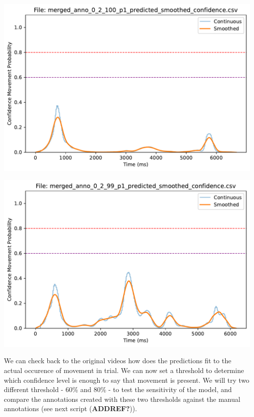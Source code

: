 \documentclass[
  letterpaper,
  DIV=11,
  numbers=noendperiod]{scrreprt}
\begin{document}
\includegraphics{04_TS_movementAnnotation/02_MovementClassifier_final_files/figure-pdf/cell-11-output-4.pdf}

\includegraphics{04_TS_movementAnnotation/02_MovementClassifier_final_files/figure-pdf/cell-11-output-5.pdf}

We can check back to the original videos how does the predictions fit to
the actual occurence of movement in trial. We can now set a threshold to
determine which confidence level is enough to say that movement is
present. We will try two different threshold - 60\% and 80\% - to test
the sensitivity of the model, and compare the annotations created with
these two thresholds against the manual annotations (see next script
(\textbf{ADDREF?})).
\end{document}
